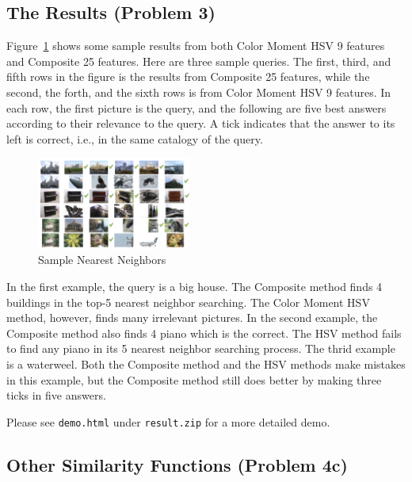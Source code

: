 \documentclass{acm_proc_article-sp}
\begin{document}
\subsection{The Results (Problem 3)}
Figure~\ref{fig:result} shows some sample results from both
    Color Moment HSV 9 features and
    Composite 25 features.
Here are three sample queries.
The first, third, and fifth rows in the figure
    is the results from Composite 25 features,
    while the second, the forth, and the sixth
    rows is from Color Moment HSV 9 features.
In each row, the first picture is the query,
    and the following are five best answers according to
    their relevance to the query.
A tick indicates that the answer to its left is correct,
    i.e., in the same catalogy of the query.
\begin{figure} \centering
    \includegraphics[width=0.45\textwidth]{data/result.png}
    \caption{Sample Nearest Neighbors}
    \label{fig:result}
\end{figure}

In the first example, the query is a big house.
The Composite method finds 4 buildings in the top-5 nearest neighbor searching.
The Color Moment HSV method, however, finds many
    irrelevant pictures.
In the second example, the Composite method
    also finds 4 piano which is the correct.
The HSV method fails to find any piano in its
    5 nearest neighbor searching process.
The thrid example is a waterweel.
Both the Composite method and the HSV methods make mistakes
    in this example,
    but the Composite method still does better
    by making three ticks in five answers.

Please see \texttt{demo.html} under \texttt{result.zip} for a more detailed demo.

\subsection{Other Similarity Functions (Problem 4c)}
\end{document}
